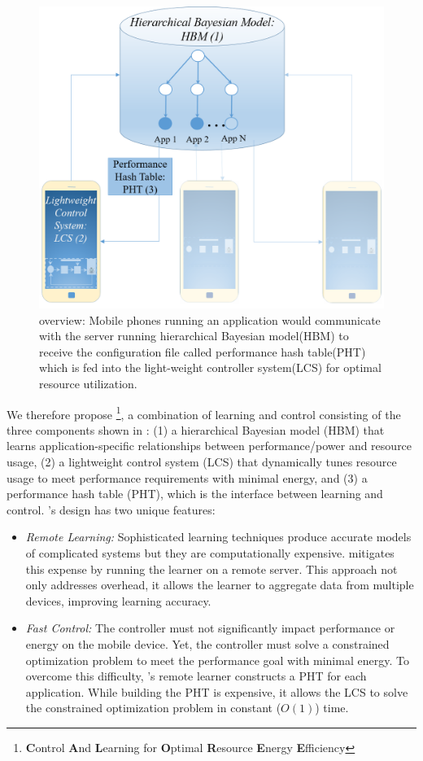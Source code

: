 \begin{figure}
\includegraphics[width=\columnwidth]{figures/Mobile2.png}
\caption{\SYSTEM{} overview: Mobile phones running an application would communicate with the server running hierarchical Bayesian model(HBM) to receive the configuration file called performance hash table(PHT) which is fed into the light-weight controller system(LCS) for optimal resource utilization.}
  \label{fig:overview}
\end{figure}
We therefore propose \SYSTEM{}\footnote{\textbf{C}ontrol \textbf{A}nd
  \textbf{L}earning for \textbf{O}ptimal \textbf{R}esource
  \textbf{E}nergy \textbf{E}fficiency}, a combination of learning and
control consisting of the three components shown in
: (1) a hierarchical Bayesian model (HBM) that
learns application-specific relationships between performance/power
and resource usage, (2) a lightweight control system (LCS) that
dynamically tunes resource usage to meet performance requirements with
minimal energy, and (3) a performance hash table (PHT), which is the
interface between learning and control.  \SYSTEM{}'s design has two
unique features:
\begin{itemize}
\item \textit{Remote Learning:} Sophisticated learning techniques
  produce accurate models of complicated systems but they are
  computationally expensive.  \SYSTEM{} mitigates this expense by
  running the learner on a remote server. This approach not only
  addresses overhead, it allows the learner to aggregate data from
  multiple devices, improving learning accuracy.
\item \textit{Fast Control:} The controller must not significantly
  impact performance or energy on the mobile device.  Yet, the
  controller must solve a constrained optimization problem to meet the
  performance goal with minimal energy.  To overcome this difficulty,
  \SYSTEM{}'s remote learner constructs a PHT for each application.
  While building the PHT is expensive, it allows the LCS to solve the
  constrained optimization problem in constant ($O(1)$) time.
\end{itemize}

